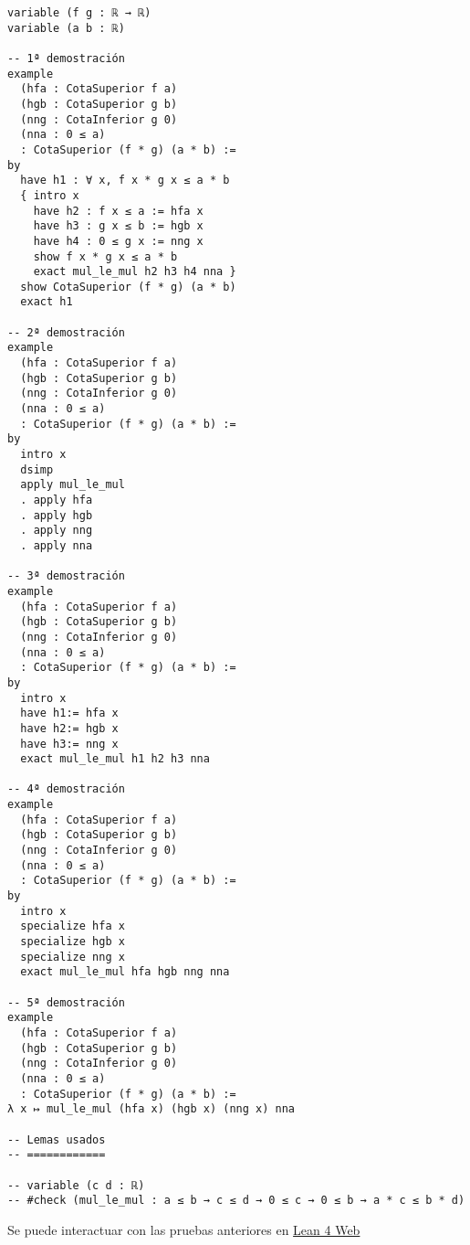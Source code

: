 \begin{verbatim}
variable (f g : ℝ → ℝ)
variable (a b : ℝ)

-- 1ª demostración
example
  (hfa : CotaSuperior f a)
  (hgb : CotaSuperior g b)
  (nng : CotaInferior g 0)
  (nna : 0 ≤ a)
  : CotaSuperior (f * g) (a * b) :=
by
  have h1 : ∀ x, f x * g x ≤ a * b
  { intro x
    have h2 : f x ≤ a := hfa x
    have h3 : g x ≤ b := hgb x
    have h4 : 0 ≤ g x := nng x
    show f x * g x ≤ a * b
    exact mul_le_mul h2 h3 h4 nna }
  show CotaSuperior (f * g) (a * b)
  exact h1

-- 2ª demostración
example
  (hfa : CotaSuperior f a)
  (hgb : CotaSuperior g b)
  (nng : CotaInferior g 0)
  (nna : 0 ≤ a)
  : CotaSuperior (f * g) (a * b) :=
by
  intro x
  dsimp
  apply mul_le_mul
  . apply hfa
  . apply hgb
  . apply nng
  . apply nna

-- 3ª demostración
example
  (hfa : CotaSuperior f a)
  (hgb : CotaSuperior g b)
  (nng : CotaInferior g 0)
  (nna : 0 ≤ a)
  : CotaSuperior (f * g) (a * b) :=
by
  intro x
  have h1:= hfa x
  have h2:= hgb x
  have h3:= nng x
  exact mul_le_mul h1 h2 h3 nna

-- 4ª demostración
example
  (hfa : CotaSuperior f a)
  (hgb : CotaSuperior g b)
  (nng : CotaInferior g 0)
  (nna : 0 ≤ a)
  : CotaSuperior (f * g) (a * b) :=
by
  intro x
  specialize hfa x
  specialize hgb x
  specialize nng x
  exact mul_le_mul hfa hgb nng nna

-- 5ª demostración
example
  (hfa : CotaSuperior f a)
  (hgb : CotaSuperior g b)
  (nng : CotaInferior g 0)
  (nna : 0 ≤ a)
  : CotaSuperior (f * g) (a * b) :=
λ x ↦ mul_le_mul (hfa x) (hgb x) (nng x) nna

-- Lemas usados
-- ============

-- variable (c d : ℝ)
-- #check (mul_le_mul : a ≤ b → c ≤ d → 0 ≤ c → 0 ≤ b → a * c ≤ b * d)
\end{verbatim}
Se puede interactuar con las pruebas anteriores en \href{https://lean.math.hhu.de/\#url=https://raw.githubusercontent.com/jaalonso/Calculemus2/main/src/Cota\_superior\_del\_producto.lean}{Lean 4 Web}

